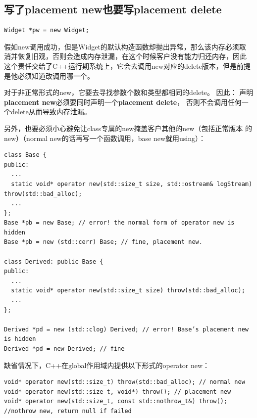 \subsection{写了placement new也要写placement delete}
\label{sec:Item-52}

\begin{verbatim}
Widget *pw = new Widget;
\end{verbatim}
假如new调用成功，但是Widget的默认构造函数却抛出异常，那么该内存必须取
消并恢复旧观，否则会造成内存泄漏，在这个时候客户没有能力归还内存，因此
这个责任交给了C++运行期系统上，它会去调用new对应的delete版本，但是前提
是他必须知道改调用哪一个。

对于非正常形式的new，它要去寻找参数个数和类型都相同的delete。 因此：
声明\textbf{placement new}必须要同时声明一个\textbf{placement delete}，
否则不会调用任何一个delete从而导致内存泄漏。

另外，也要必须小心避免让class专属的new掩盖客户其他的new（包括正常版本
的new）（normal new的话再写一个函数调用，base new就用using）：
\begin{verbatim}
class Base {
public:
  ...
  static void* operator new(std::size_t size, std::ostream& logStream) throw(std::bad_alloc); 
  ...
};
Base *pb = new Base; // error! the normal form of operator new is hidden
Base *pb = new (std::cerr) Base; // fine, placement new.

class Derived: public Base {
public:
  ...
  static void* operator new(std::size_t size) throw(std::bad_alloc);
  ...
};

Derived *pd = new (std::clog) Derived; // error! Base’s placement new is hidden
Derived *pd = new Derived; // fine
\end{verbatim}

缺省情况下，C++在global作用域内提供以下形式的operator new：
\begin{verbatim}
void* operator new(std::size_t) throw(std::bad_alloc); // normal new
void* operator new(std::size_t, void*) throw(); // placement new
void* operator new(std::size_t, const std::nothrow_t&) throw(); //nothrow new, return null if failed 
\end{verbatim}




